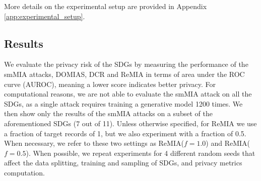 More details on the experimental setup are provided in Appendix \ref{app:experimental_setup}.

\subsection{Results}

We evaluate the privacy risk of the SDGs by measuring the performance of the smMIA attacks, DOMIAS, DCR and ReMIA in terms of area under the ROC curve (AUROC), meaning a lower score indicates better privacy.
For computational reasons, we are not able to evaluate the smMIA attack on all the SDGs, as a single attack requires training a generative model 1200 times. We then show only the results of the smMIA attacks on a subset of the aforementioned SDGs (7 out of 11).
Unless otherwise specified, for ReMIA we use a fraction of target records of 1, but we also experiment with a fraction of 0.5. When necessary, we refer to these two settings as ReMIA($f=1.0$) and ReMIA($f=0.5$).
When possible, we repeat experiments for 4 different random seeds that affect the data splitting, training and sampling of SDGs, and privacy metrics computation.

